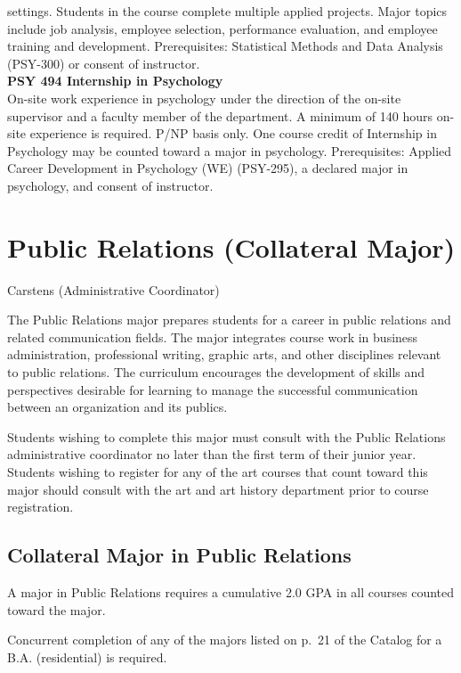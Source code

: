 \documentclass[
  letterpaper,
]{scrbook}
\begin{document}
settings. Students in the course complete multiple applied projects.
Major topics include job analysis, employee selection, performance
evaluation, and employee training and development. Prerequisites:
Statistical Methods and Data Analysis (PSY-300) or consent of
instructor.\\
\textbf{PSY 494 Internship in Psychology}\\
On-site work experience in psychology under the direction of the on-site
supervisor and a faculty member of the department. A minimum of 140
hours on-site experience is required. P/NP basis only. One course credit
of Internship in Psychology may be counted toward a major in psychology.
Prerequisites: Applied Career Development in Psychology (WE) (PSY-295),
a declared major in psychology, and consent of instructor.

\section{Public Relations (Collateral
Major)}\label{public-relations-collateral-major}

Carstens (Administrative Coordinator)

The Public Relations major prepares students for a career in public
relations and related communication fields. The major integrates course
work in business administration, professional writing, graphic arts, and
other disciplines relevant to public relations. The curriculum
encourages the development of skills and perspectives desirable for
learning to manage the successful communication between an organization
and its publics.

Students wishing to complete this major must consult with the Public
Relations administrative coordinator no later than the first term of
their junior year. Students wishing to register for any of the art
courses that count toward this major should consult with the art and art
history department prior to course registration.

\subsection{Collateral Major in Public
Relations}\label{collateral-major-in-public-relations}

A major in Public Relations requires a cumulative 2.0 GPA in all courses
counted toward the major.

Concurrent completion of any of the majors listed on p.~21 of the
Catalog for a B.A. (residential) is required.
\end{document}
